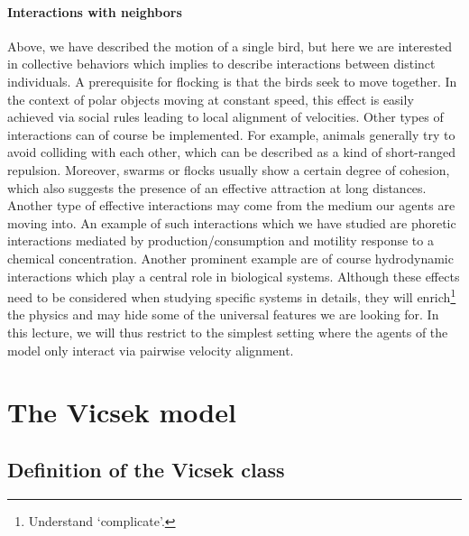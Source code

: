  \paragraph*{Interactions with neighbors}
 Above, we have described the motion of a single bird, but here we are interested in collective behaviors which implies to describe interactions between distinct individuals.
 A prerequisite for flocking is that the birds seek to move together. 
 In the context of polar objects moving at constant speed, this effect is easily achieved via social rules leading to local alignment of velocities.
 Other types of interactions can of course be implemented. 
 For example, animals generally try to avoid colliding with each other, which can be described as a kind of short-ranged repulsion. Moreover, swarms or flocks usually show a certain degree of cohesion, which also suggests the presence of an effective attraction at long distances. 
 Another type of effective interactions may come from the medium our agents are moving into. An example of such interactions which we have studied are phoretic interactions mediated by production/consumption and motility response to a chemical concentration. 
 Another prominent example are of course hydrodynamic interactions which play a central role in biological systems.
 Although these effects need to be considered when studying specific systems in details, they will enrich\footnote{Understand `complicate'.} the physics and may hide some of the universal features we are looking for. 
 In this lecture, we will thus restrict to the simplest setting where the agents of the model only interact via pairwise velocity alignment.


\section{The Vicsek model}

\subsection{Definition of the Vicsek class}

